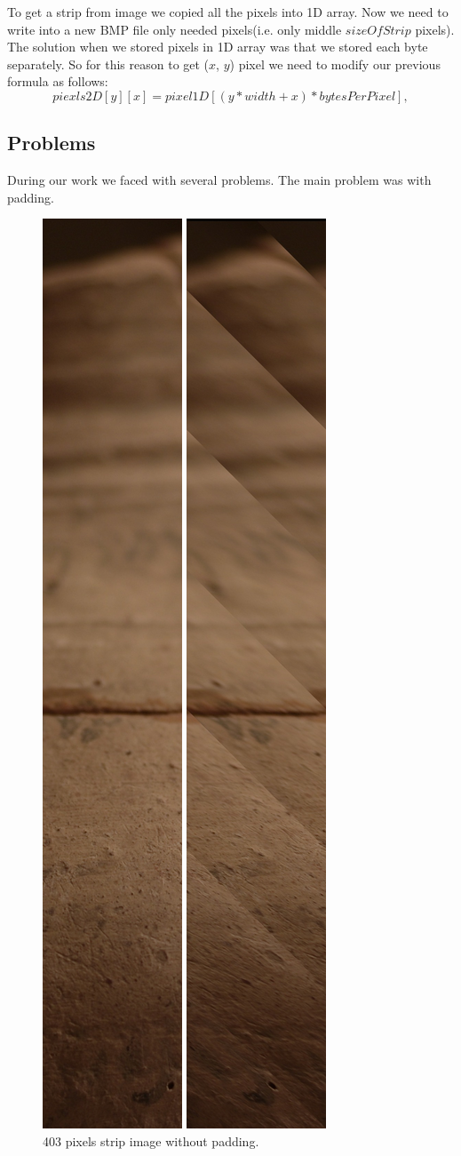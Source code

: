 \documentclass[a4paper]{article}
\begin{document}
To get a strip from image we copied all the pixels into 1D array. Now we need to write into a new BMP file only needed pixels(i.e. only middle $size Of Strip$ pixels). The solution when we stored pixels in 1D array was that we stored each byte separately. So for this reason to get ($x$, $y$) pixel we need to modify our previous formula as follows:
\[piexls2D[y][x] = pixel1D[(y * width + x) * bytesPerPixel],\]


\subsection{Problems}
During our work we faced with several problems. The main problem was with padding. 

\begin{figure}[h]
\centering
\begin{minipage}{.45\textwidth}
  \centering
  \includegraphics[height=.7\linewidth]{L1019472_S403_with_padding_.jpg}
  \caption{\label{fig:strip2}403 pixels strip image with padding.}
\end{minipage}
\begin{minipage}{.45\textwidth}
  \centering
  \includegraphics[height=.7\linewidth]{L1019472_S403_without_padding_.jpg}
  \caption{\label{fig:strip3}403 pixels strip image without padding.}
\end{minipage}
\end{figure}
\end{document}
